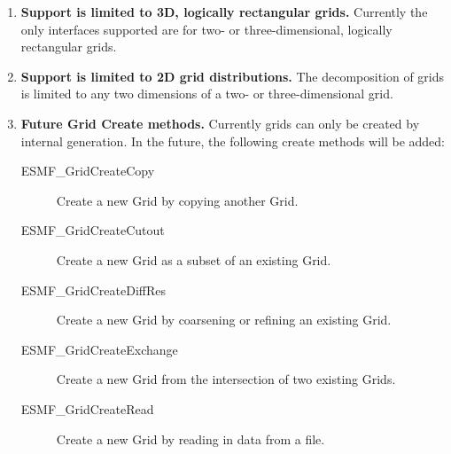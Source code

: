 

\begin{enumerate}

\item {\bf Support is limited to 3D, logically rectangular grids.} 
Currently the only interfaces supported are for two- or 
three-dimensional, logically rectangular grids. 

\item {\bf Support is limited to 2D grid distributions.} The 
decomposition of grids is limited to any two dimensions of a two-
or three-dimensional grid.

\item {\bf Future Grid Create methods.}  Currently grids can only
be created by internal generation.  In the future, the following
create methods will be added:
 \begin{description}
    \item [ESMF\_GridCreateCopy]
          Create a new Grid by copying another Grid.
    \item [ESMF\_GridCreateCutout]
          Create a new Grid as a subset of an existing Grid.
    \item [ESMF\_GridCreateDiffRes]
          Create a new Grid by coarsening or refining an existing Grid.
    \item [ESMF\_GridCreateExchange]
          Create a new Grid from the intersection of two existing Grids.
    \item [ESMF\_GridCreateRead]
          Create a new Grid by reading in data from a file.
 \end{description}


\end{enumerate}
